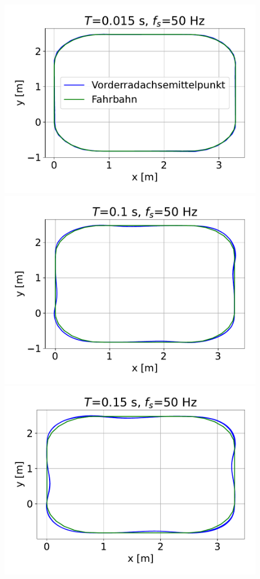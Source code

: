\documentclass[arbeit=studie,oneside,BCOR=12mm]{ArbeitRST}
\begin{document}
\begin{figure}[h]
    \centering
    \includegraphics[scale=0.47]{0.015ms50Hz}
    \includegraphics[scale=0.47]{0.1ms50Hz}
    \includegraphics[scale=0.47]{0.15ms50Hz}

\end{figure}
\end{document}
